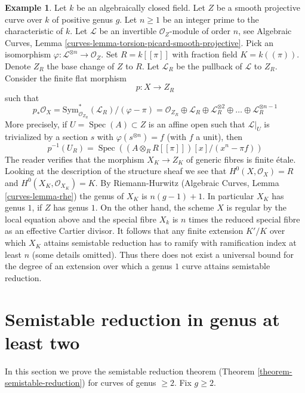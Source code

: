 \documentclass{stacks-project}
\theoremstyle{plain}
\theoremstyle{definition}
\newtheorem{example}[subsection]{Example}
\theoremstyle{remark}
\numberwithin{equation}{subsection}
\def\Spec{\mathop{\mathrm{Spec}}}
\begin{document}
\begin{example}
\label{example-extension-necessary-genus-one}
Let $k$ be an algebraically closed field. Let $Z$ be a smooth projective curve
over $k$ of positive genus $g$. Let $n \geq 1$ be an integer prime to the
characteristic of $k$. Let $\mathcal{L}$ be an
invertible $\mathcal{O}_Z$-module of order $n$, see
Algebraic Curves, Lemma \ref{curves-lemma-torsion-picard-smooth-projective}.
Pick an isomorphism $\varphi : \mathcal{L}^{\otimes n} \to \mathcal{O}_Z$.
Set $R = k[[\pi]]$ with fraction field $K = k((\pi))$. Denote $Z_R$
the base change of $Z$ to $R$. Let $\mathcal{L}_R$
be the pullback of $\mathcal{L}$ to $Z_R$.
Consider the finite flat morphism
$$
p : X \longrightarrow Z_R
$$
such that
$$
p_*\mathcal{O}_X =
\text{Sym}^*_{\mathcal{O}_{Z_R}}(\mathcal{L}_R)/(\varphi - \pi) =
\mathcal{O}_{Z_R} \oplus \mathcal{L}_R \oplus
\mathcal{L}_R^{\otimes 2} \oplus \ldots \oplus \mathcal{L}_R^{\otimes n - 1}
$$
More precisely, if $U = \Spec(A) \subset Z$ is an affine open
such that $\mathcal{L}|_U$ is trivialized by a section $s$
with $\varphi(s^{\otimes n}) = f$ (with $f$ a unit), then
$$
p^{-1}(U_R) = \Spec\left(
(A \otimes_R R[[\pi]])[x]/(x^n - \pi f)
\right)
$$
The reader verifies that the morphism $X_K \to Z_K$ of
generic fibres is finite \'etale. Looking at the description
of the structure sheaf we see that $H^0(X, \mathcal{O}_X) = R$
and $H^0(X_K, \mathcal{O}_{X_K}) = K$. By Riemann-Hurwitz
(Algebraic Curves, Lemma \ref{curves-lemma-rhe})
the genus of $X_K$ is $n(g - 1) + 1$. In particular $X_K$
has genus $1$, if $Z$ has genus $1$.
On the other hand, the scheme $X$ is regular
by the local equation above and the special fibre $X_k$ is
$n$ times the reduced special fibre as an effective Cartier divisor.
It follows that any finite extension $K'/K$ over which
$X_K$ attains semistable reduction has to ramify
with ramification index at least $n$ (some details omitted).
Thus there does not exist a universal bound for the
degree of an extension over which a genus $1$ curve attains
semistable reduction.
\end{example}






\section{Semistable reduction in genus at least two}
\label{section-semistable-reduction-genus-at-least-two}

\noindent
In this section we prove the semistable reduction theorem
(Theorem \ref{theorem-semistable-reduction}) for curves of genus $\geq 2$.
Fix $g \geq 2$.
\end{document}

